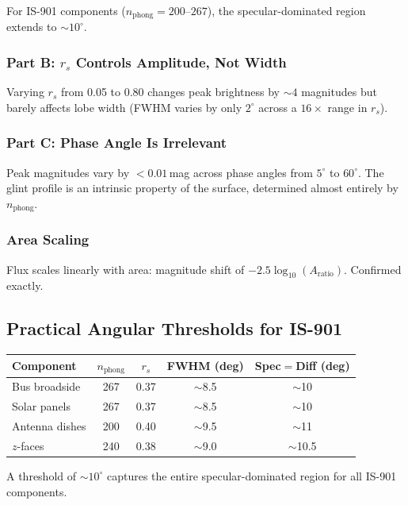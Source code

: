 \documentclass[11pt,a4paper]{article}
\begin{document}
For IS-901 components ($n_{\mathrm{phong}} = 200$--$267$), the specular-dominated region extends to ${\sim}10^\circ$.

\subsubsection{Part B: $r_s$ Controls Amplitude, Not Width}

Varying $r_s$ from 0.05 to 0.80 changes peak brightness by ${\sim}4$ magnitudes but barely affects lobe width (FWHM varies by only $2^\circ$ across a $16\times$ range in $r_s$).

\subsubsection{Part C: Phase Angle Is Irrelevant}

Peak magnitudes vary by $<0.01$\,mag across phase angles from $5^\circ$ to $60^\circ$. The glint profile is an intrinsic property of the surface, determined almost entirely by $n_{\mathrm{phong}}$.

\subsubsection{Area Scaling}

Flux scales linearly with area: magnitude shift of $-2.5\log_{10}(A_{\mathrm{ratio}})$. Confirmed exactly.

\subsection{Practical Angular Thresholds for IS-901}

\begin{table}[H]
\centering
\begin{tabular}{lcccc}
\toprule
Component & $n_{\mathrm{phong}}$ & $r_s$ & FWHM (deg) & Spec$=$Diff (deg) \\
\midrule
Bus broadside & 267 & 0.37 & $\sim$8.5 & $\sim$10 \\
Solar panels & 267 & 0.37 & $\sim$8.5 & $\sim$10 \\
Antenna dishes & 200 & 0.40 & $\sim$9.5 & $\sim$11 \\
$z$-faces & 240 & 0.38 & $\sim$9.0 & $\sim$10.5 \\
\bottomrule
\end{tabular}
\end{table}

A threshold of ${\sim}10^\circ$ captures the entire specular-dominated region for all IS-901 components.
\end{document}

